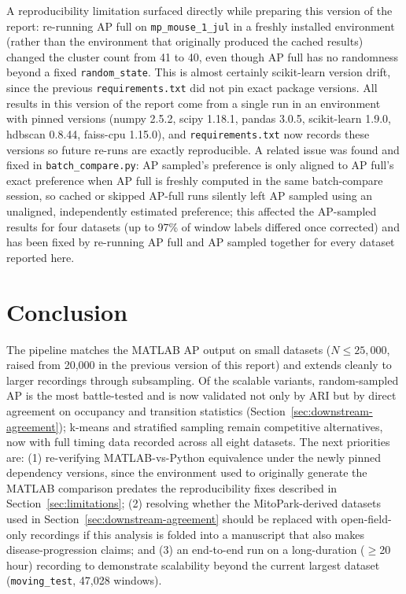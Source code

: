 \documentclass[11pt]{article}
\begin{document}
A reproducibility limitation surfaced directly while preparing this version of the report: re-running AP full on \texttt{mp\_mouse\_1\_jul} in a freshly installed environment (rather than the environment that originally produced the cached results) changed the cluster count from 41 to 40, even though AP full has no randomness beyond a fixed \texttt{random\_state}. This is almost certainly scikit-learn version drift, since the previous \texttt{requirements.txt} did not pin exact package versions. All results in this version of the report come from a single run in an environment with pinned versions (numpy 2.5.2, scipy 1.18.1, pandas 3.0.5, scikit-learn 1.9.0, hdbscan 0.8.44, faiss-cpu 1.15.0), and \texttt{requirements.txt} now records these versions so future re-runs are exactly reproducible. A related issue was found and fixed in \texttt{batch\_compare.py}: AP sampled's preference is only aligned to AP full's exact preference when AP full is freshly computed in the same batch-compare session, so cached or skipped AP-full runs silently left AP sampled using an unaligned, independently estimated preference; this affected the AP-sampled results for four datasets (up to 97\% of window labels differed once corrected) and has been fixed by re-running AP full and AP sampled together for every dataset reported here.

\FloatBarrier
\section{Conclusion}

The pipeline matches the MATLAB AP output on small datasets ($N \leq 25{,}000$, raised from 20,000 in the previous version of this report) and extends cleanly to larger recordings through subsampling. Of the scalable variants, random-sampled AP is the most battle-tested and is now validated not only by ARI but by direct agreement on occupancy and transition statistics (Section~\ref{sec:downstream-agreement}); k-means and stratified sampling remain competitive alternatives, now with full timing data recorded across all eight datasets. The next priorities are: (1) re-verifying MATLAB-vs-Python equivalence under the newly pinned dependency versions, since the environment used to originally generate the MATLAB comparison predates the reproducibility fixes described in Section~\ref{sec:limitations}; (2) resolving whether the MitoPark-derived datasets used in Section~\ref{sec:downstream-agreement} should be replaced with open-field-only recordings if this analysis is folded into a manuscript that also makes disease-progression claims; and (3) an end-to-end run on a long-duration ($\geq$20 hour) recording to demonstrate scalability beyond the current largest dataset (\texttt{moving\_test}, 47,028 windows).
\end{document}
